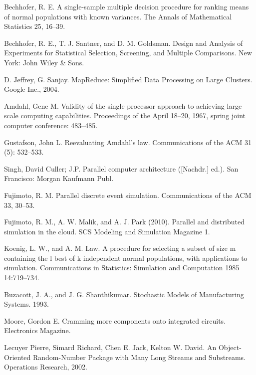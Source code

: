 \begin{thebibliography}{99}
 Bechhofer, R. E. A single-sample multiple decision procedure for ranking means of normal populations with known variances. The Annals of Mathematical Statistics 25, 16–39.

 Bechhofer, R. E., T. J. Santner, and D. M. Goldsman. Design and Analysis of Experiments for Statistical Selection, Screening, and Multiple Comparisons. New York: John Wiley \& Sons.

 D. Jeffrey, G. Sanjay. MapReduce: Simplified Data Processing on Large Clusters. Google Inc., 2004.

 Amdahl, Gene M. Validity of the single processor approach to achieving large scale computing capabilities. Proceedings of the April 18–20, 1967, spring joint computer conference: 483–485.

 Gustafson, John L. Reevaluating Amdahl's law. Communications of the ACM 31 (5): 532–533.

 Singh, David Culler; J.P. Parallel computer architecture ([Nachdr.] ed.). San Francisco: Morgan Kaufmann Publ.

 Fujimoto, R. M. Parallel discrete event simulation. Communications of the ACM 33, 30–53.

 Fujimoto, R. M., A. W. Malik, and A. J. Park (2010). Parallel and distributed simulation in the cloud. SCS Modeling and Simulation Magazine 1.

 Koenig, L. W., and A. M. Law. A procedure for selecting a subset of size m containing the l best of k independent normal populations, with applications to simulation. Communications in Statistics: Simulation and Computation 1985 14:719–734.

 Buzacott, J. A., and J. G. Shanthikumar. Stochastic Models of Manufacturing Systems. 1993.

 Moore, Gordon E. Cramming more components onto integrated circuits. Electronics Magazine.

 Lecuyer Pierre, Simard Richard, Chen E. Jack, Kelton W. David. An Object-Oriented Random-Number Package with Many Long Streams and Substreams. Operations Research, 2002.

\end{thebibliography}

